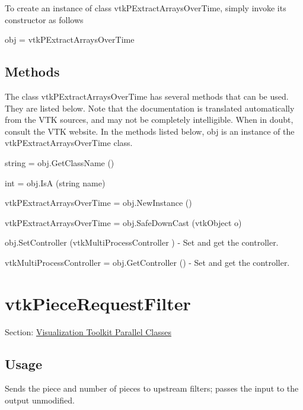 To create an instance of class vtk\-P\-Extract\-Arrays\-Over\-Time, simply invoke its constructor as follows \begin{DoxyVerb}  obj = vtkPExtractArraysOverTime
\end{DoxyVerb}
 \hypertarget{vtkwidgets_vtkxyplotwidget_Methods}{}\subsection{Methods}\label{vtkwidgets_vtkxyplotwidget_Methods}
The class vtk\-P\-Extract\-Arrays\-Over\-Time has several methods that can be used. They are listed below. Note that the documentation is translated automatically from the V\-T\-K sources, and may not be completely intelligible. When in doubt, consult the V\-T\-K website. In the methods listed below, {\ttfamily obj} is an instance of the vtk\-P\-Extract\-Arrays\-Over\-Time class. 
\begin{DoxyItemize}
\item {\ttfamily string = obj.\-Get\-Class\-Name ()}  
\item {\ttfamily int = obj.\-Is\-A (string name)}  
\item {\ttfamily vtk\-P\-Extract\-Arrays\-Over\-Time = obj.\-New\-Instance ()}  
\item {\ttfamily vtk\-P\-Extract\-Arrays\-Over\-Time = obj.\-Safe\-Down\-Cast (vtk\-Object o)}  
\item {\ttfamily obj.\-Set\-Controller (vtk\-Multi\-Process\-Controller )} -\/ Set and get the controller.  
\item {\ttfamily vtk\-Multi\-Process\-Controller = obj.\-Get\-Controller ()} -\/ Set and get the controller.  
\end{DoxyItemize}\hypertarget{vtkparallel_vtkpiecerequestfilter}{}\section{vtk\-Piece\-Request\-Filter}\label{vtkparallel_vtkpiecerequestfilter}
Section\-: \hyperlink{sec_vtkparallel}{Visualization Toolkit Parallel Classes} \hypertarget{vtkwidgets_vtkxyplotwidget_Usage}{}\subsection{Usage}\label{vtkwidgets_vtkxyplotwidget_Usage}
Sends the piece and number of pieces to upstream filters; passes the input to the output unmodified.

